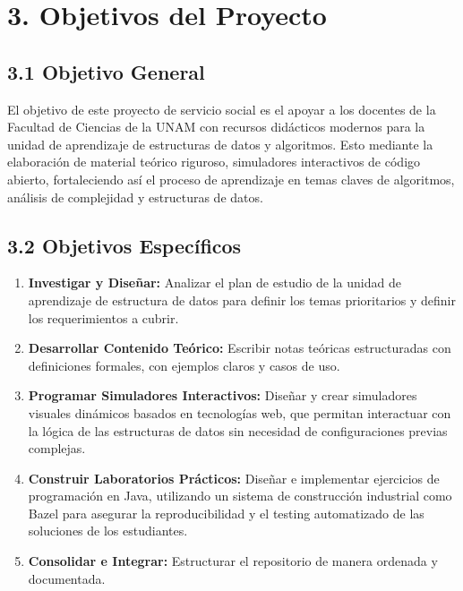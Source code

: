 \documentclass[12 pt]{article}
\begin{document}
\section*{3. Objetivos del Proyecto}

\subsection*{3.1 Objetivo General}

El objetivo de este proyecto de servicio social es el apoyar a los docentes de la Facultad de Ciencias de la UNAM con recursos didácticos modernos para la unidad de aprendizaje de estructuras de datos y algoritmos. Esto mediante la elaboración de material teórico riguroso, simuladores interactivos de código abierto, fortaleciendo así el proceso de aprendizaje en temas claves de algoritmos, análisis de complejidad y estructuras de datos.

\subsection*{3.2 Objetivos Específicos}
\begin{enumerate}
    \item \textbf{Investigar y Diseñar:} Analizar el plan de estudio de la unidad de aprendizaje de estructura de datos para definir los temas prioritarios y definir los requerimientos a cubrir.
    \item \textbf{Desarrollar Contenido Teórico:} Escribir notas teóricas estructuradas con definiciones formales, con ejemplos claros y casos de uso.
    \item \textbf{Programar Simuladores Interactivos:} Diseñar y crear simuladores visuales dinámicos basados en tecnologías web, que permitan interactuar con la lógica de las estructuras de datos sin necesidad de configuraciones previas complejas.
    \item \textbf{Construir Laboratorios Prácticos:} Diseñar e implementar ejercicios de programación en Java, utilizando un sistema de construcción industrial como Bazel para asegurar la reproducibilidad y el testing automatizado de las soluciones de los estudiantes.
    \item \textbf{Consolidar e Integrar:} Estructurar el repositorio de manera ordenada y documentada.
\end{enumerate}
\end{document}
